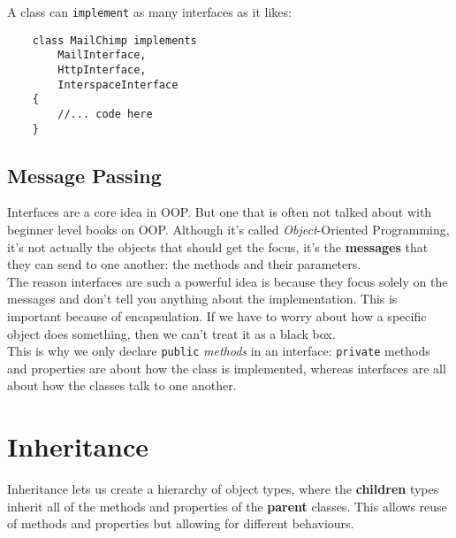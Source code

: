 A class can \texttt{implement} as many interfaces as it likes:

\begin{verbatim}
    class MailChimp implements
        MailInterface,
        HttpInterface,
        InterspaceInterface
    {
        //... code here
    }
\end{verbatim}


\subsection{Message Passing}

Interfaces are a core idea in OOP. But one that is often not talked about with beginner level books on OOP. Although it's called \textit{Object}-Oriented Programming, it's not actually the objects that should get the focus, it's the \textbf{messages} that they can send to one another: the methods and their parameters.
\\

The reason interfaces are such a powerful idea is because they focus solely on the messages and don't tell you anything about the implementation. This is important because of encapsulation. If we have to worry about how a specific object does something, then we can't treat it as a black box.
\\

This is why we only declare \texttt{public} \textit{methods} in an interface: \texttt{private} methods and properties are about how the class is implemented, whereas interfaces are all about how the classes talk to one another.
\\





\section{Inheritance}

Inheritance lets us create a hierarchy of object types, where the \textbf{children} types inherit all of the methods and properties of the \textbf{parent} classes. This allows reuse of methods and properties but allowing for different behaviours.
\\

